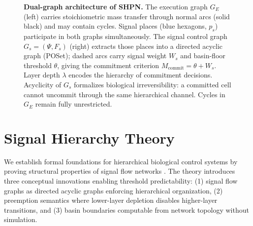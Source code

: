 \documentclass[10pt,letterpaper]{article}
\begin{document}
\begin{figure}[t]
\caption{\textbf{Dual-graph architecture of SHPN.} The execution graph $G_E$
(left) carries stoichiometric mass transfer through normal arcs (solid black)
and may contain cycles. Signal places (blue hexagons, $p_s$) participate in
both graphs simultaneously. The signal control graph $G_s = (\Psi, F_s)$
(right) extracts those places into a directed acyclic graph (POSet); dashed
arcs carry signal weight $W_s$ and basin-floor threshold $\theta$, giving the
commitment criterion $M_{\mathrm{commit}} = \theta + W_s$. Layer depth
$\lambda$ encodes the hierarchy of commitment decisions. Acyclicity of $G_s$
formalizes biological irreversibility: a committed cell cannot uncommit through
the same hierarchical channel. Cycles in $G_E$ remain fully unrestricted.}
\label{fig:dual_graph}
\end{figure}

\section{Signal Hierarchy Theory}

We establish formal foundations for hierarchical biological control systems by proving structural properties of signal flow networks \cite{petri1962,murata1989}. The theory introduces three conceptual innovations enabling threshold predictability: (1) signal flow graphs as directed acyclic graphs enforcing hierarchical organization, (2) preemption semantics where lower-layer depletion disables higher-layer transitions, and (3) basin boundaries computable from network topology without simulation.
\end{document}
